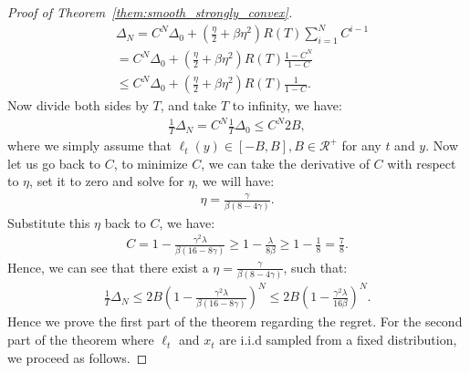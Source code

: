 \begin{proof}[Proof of Theorem~\ref{them:smooth_strongly_convex}]
\begin{align}
&\Delta_N = C^N\Delta_0 + (\frac{\eta}{2}+\beta\eta^2)R(T)\sum_{i=1}^N C^{i-1}\nonumber \\
&= C^N\Delta_0 + (\frac{\eta}{2}+\beta\eta^2)R(T) \frac{1-C^N}{1-C}\nonumber\\
&\leq C^N\Delta_0 + (\frac{\eta}{2}+\beta\eta^2)R(T)\frac{1}{1-C}. \nonumber
\end{align}  Now divide both sides by $T$, and take $T$ to infinity, we have:
\begin{align}
\frac{1}{T}\Delta_N = C^N\frac{1}{T}\Delta_0 \leq  C^N 2B,
\end{align} where we simply assume that $\ell_t(y) \in [-B,B], B\in\mathcal{R}^+$ for any $t$ and $y$.
Now let us go back to $C$, to minimize $C$, we can take the derivative of $C$ with respect to $\eta$, set it to zero and solve for $\eta$, we will have:
\begin{align}
\eta = \frac{\gamma}{\beta(8-4\gamma)}. 
\end{align}
Substitute this $\eta$ back to $C$, we have:
\begin{align}
C = 1 - \frac{\gamma^2\lambda}{\beta(16-8\gamma)} \geq 1 - \frac{\lambda}{8\beta} \geq 1- \frac{1}{8} = \frac{7}{8}.
\end{align}
Hence, we can see that there exist a $\eta = \frac{\gamma}{\beta(8-4\gamma)}$, such that:
\begin{align}
\label{eq:before_exp}
\frac{1}{T}\Delta_N \leq 2B (1 - \frac{\gamma^2\lambda}{\beta(16-8\gamma)})^N 
    \leq 2B (1 - \frac{\gamma^2\lambda}{16\beta})^N.
\end{align} Hence we prove the first part of the theorem regarding the regret. For the second part of the theorem where $\ell_t$ and $x_t$ are i.i.d sampled from a fixed distribution, we proceed as follows. 


\end{proof}
